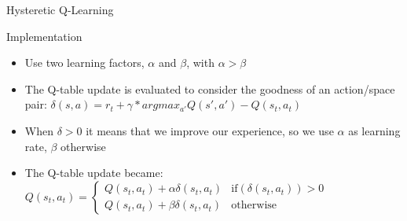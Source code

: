 \documentclass[presentation]{beamer}\mode<presentation>{\usetheme{AMSBolognaFC}}
\begin{document}
\begin{frame}{Hysteretic Q-Learning}
	\begin{exampleblock}{Implementation}
		\begin{itemize}
			\item Use two learning factors, $\alpha$ and $\beta$, with $\alpha > \beta$
			\item The Q-table update is evaluated to consider the goodness of an action/space pair: $\delta(s, a) = r_t + \gamma * argmax_{a'}Q(s', a') - Q(s_t, a_t)$
			\item When $\delta > 0$ it means that we improve our experience, so we use $\alpha$ as learning rate, $\beta$ otherwise
			\item The Q-table update became: $ Q(s_t, a_t) =
			\begin{cases}
				Q(s_t, a_t) + \alpha{\delta(s_t, a_t)} & \text{if} (\delta(s_t, a_t)) > 0 \\
				Q(s_t, a_t) + \beta{\delta(s_t, a_t)} & \text{otherwise}
			\end{cases} $
		\end{itemize}
	\end{exampleblock}
\end{frame}
\end{document}
